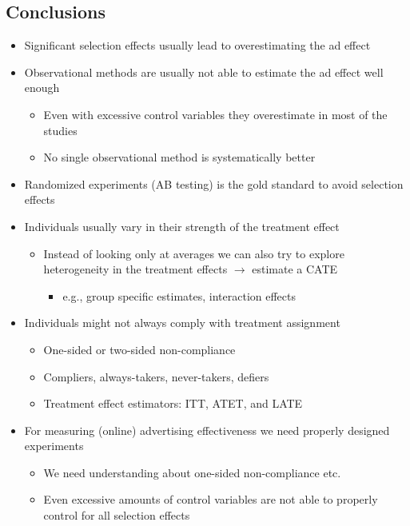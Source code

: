 \documentclass[10pt]{article}
\begin{document}
\subsection{Conclusions}
\begin{itemize}
    \item Significant selection effects usually lead to overestimating the ad effect 
    \item Observational methods are usually not able to estimate the ad effect well enough 
    \begin{itemize}
        \item Even with excessive control variables they overestimate in most of the studies 
        \item No single observational method is systematically better
    \end{itemize}
    \item Randomized experiments (AB testing) is the gold standard to avoid selection effects 
    \item Individuals usually vary in their strength of the treatment effect 
    \begin{itemize}
        \item Instead of looking only at averages we can also try to explore heterogeneity in the treatment effects $\to $ estimate a CATE 
        \begin{itemize}
            \item e.g., group specific estimates, interaction effects
        \end{itemize}
    \end{itemize}
    \item Individuals might not always comply with treatment assignment
    \begin{itemize}
        \item One-sided or two-sided non-compliance
        \item Compliers, always-takers, never-takers, defiers 
        \item Treatment effect estimators: ITT, ATET, and LATE 
    \end{itemize}
    \item For measuring (online) advertising effectiveness we need properly designed experiments 
    \begin{itemize}
        \item We need understanding about one-sided non-compliance etc. 
        \item Even excessive amounts of control variables are not able to properly control for all selection effects
    \end{itemize}
\end{itemize}
\newpage 
\end{document}

